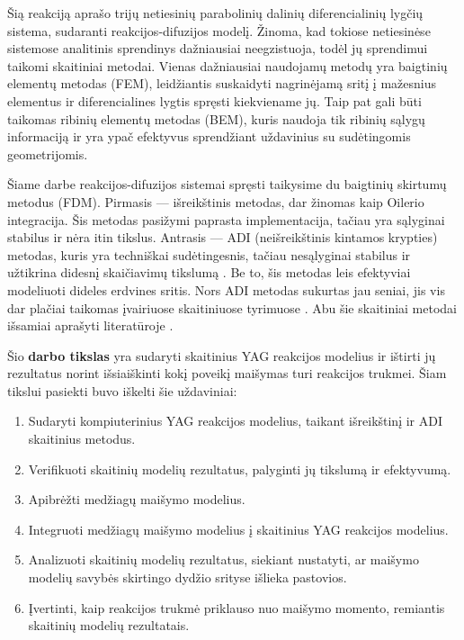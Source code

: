 Šią reakciją aprašo trijų netiesinių parabolinių dalinių diferencialinių lygčių sistema, sudaranti reakcijos-difuzijos modelį. Žinoma, kad tokiose netiesinėse sistemose analitinis sprendinys dažniausiai neegzistuoja, todėl jų sprendimui taikomi skaitiniai metodai. Vienas dažniausiai naudojamų metodų yra baigtinių elementų metodas (FEM), leidžiantis suskaidyti nagrinėjamą sritį į mažesnius elementus ir diferencialines lygtis spręsti kiekviename jų. Taip pat gali būti taikomas ribinių elementų metodas (BEM), kuris naudoja tik ribinių sąlygų informaciją ir yra ypač efektyvus sprendžiant uždavinius su sudėtingomis geometrijomis.

Šiame darbe reakcijos-difuzijos sistemai spręsti taikysime du baigtinių skirtumų metodus (FDM). Pirmasis — išreikštinis metodas, dar žinomas kaip Oilerio integracija. Šis metodas pasižymi paprasta implementacija, tačiau yra sąlyginai stabilus ir nėra itin tikslus. Antrasis — ADI (neišreikštinis kintamos krypties) metodas, kuris yra techniškai sudėtingesnis, tačiau nesąlyginai stabilus ir užtikrina didesnį skaičiavimų tikslumą \cite{doi:10.1137/0103003}. Be to, šis metodas leis efektyviai modeliuoti dideles erdvines sritis. Nors ADI metodas sukurtas jau seniai, jis vis dar plačiai taikomas įvairiuose skaitiniuose tyrimuose \cite{gaidamauskaiteComparisonFiniteDifference2007}. Abu šie skaitiniai metodai išsamiai aprašyti literatūroje \cite{pressNumericalRecipes3rd2007,levequeFiniteDifferenceMethods2007}.

Šio \textbf{darbo tikslas} yra sudaryti skaitinius YAG reakcijos modelius ir ištirti jų rezultatus norint išsiaiškinti kokį poveikį maišymas turi reakcijos trukmei. Šiam tikslui pasiekti buvo iškelti šie uždaviniai:

\begin{enumerate}
  \item Sudaryti kompiuterinius YAG reakcijos modelius, taikant išreikštinį ir ADI skaitinius metodus.
  \item Verifikuoti skaitinių modelių rezultatus, palyginti jų tikslumą ir efektyvumą.
  \item Apibrėžti medžiagų maišymo modelius.
  \item Integruoti medžiagų maišymo modelius į skaitinius YAG reakcijos modelius.
  \item Analizuoti skaitinių modelių rezultatus, siekiant nustatyti, ar maišymo modelių savybės skirtingo dydžio srityse išlieka pastovios.
  \item Įvertinti, kaip reakcijos trukmė priklauso nuo maišymo momento, remiantis skaitinių modelių rezultatais.
\end{enumerate}